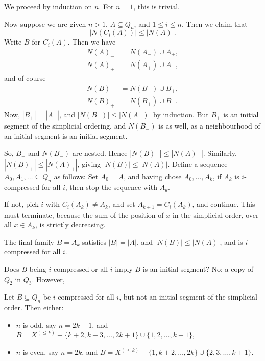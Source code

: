 \documentclass[12pt]{article}
\begin{document}
\begin{proofbox}
	We proceed by induction on $n$. For $n = 1$, this is trivial.

	Now suppose we are given $n > 1$, $A \subseteq Q_n$, and $1 \leq i \leq n$. Then we claim that
	\[
	|N(C_i(A))| \leq |N(A)|.
	\]
	Write $B$ for $C_i(A)$. Then we have
	\begin{align*}
		N(A)_{-} &= N(A_{-}) \cup A_+, \\
		N(A)_+ &= N(A_+) \cup A_-,
	\end{align*}
	and of course
	\begin{align*}
		N(B)_- &= N(B_-) \cup B_+, \\
		N(B)_+ &= N(B_+) \cup B_-.
	\end{align*}
	Now, $|B_+| = |A_+|$, and $|N(B_-)| \leq |N(A_-)|$ by induction. But $B_+$ is an initial segment of the simplicial ordering, and $N(B_-)$ is as well, as a neighbourhood of an initial segment is an initial segment.

	So, $B_+$ and $N(B_-)$ are nested. Hence $|N(B)_-| \leq |N(A)_-|$. Similarly, $|N(B)_+| \leq |N(A)_+|$, giving $|N(B)| \leq |N(A)|$.
	Define a sequence $A_0, A_1, \ldots \subseteq Q_n$ as follows: Set $A_0 = A$, and having chose $A_0, \ldots, A_k$, if $A_k$ is $i$-compressed for all $i$, then stop the sequence with $A_k$.

	If not, pick $i$ with $C_i(A_k) \neq A_k$, and set $A_{k+1} = C_i(A_k)$, and continue. This must terminate, because the sum of the position of $x$ in the simplicial order, over all $x \in A_k$, is strictly decreasing.

	The final family $B = A_k$ satisfies $|B| = |A|$, and $|N(B)| \leq |N(A)|$, and is $i$-compressed for all $i$. 
\end{proofbox}

Does $B$ being $i$-compressed or all $i$ imply $B$ is an initial segment? No; a copy of $Q_2$ in $Q_3$. However,

\begin{lemma}
	Let $B \subseteq Q_n$ be $i$-compressed for all $i$, but not an initial segment of the simplicial order. Then either:
	\begin{itemize}
		\item $n$ is odd, say $n = 2k + 1$, and $B = X^{(\leq k)} - \{k+2, k+3, \ldots, 2k+1\} \cup \{1, 2, \ldots, k+1\}$,
	\item $n$ is even, say $n = 2k$, and $B = X^{(\leq k)} - \{1, k+2, \ldots, 2k\} \cup \{2, 3, \ldots, k+1\}$.
	\end{itemize}
\end{lemma}
\end{document}
